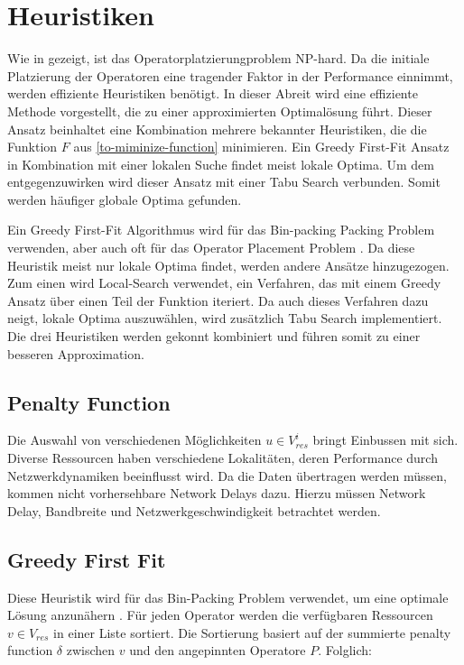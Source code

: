 \documentclass{article}
\begin{document}
\section{Heuristiken}
Wie in \cite{cardellini-optimal_operatorplc} gezeigt, ist das 
Operatorplatzierungproblem NP-hard.
Da die initiale Platzierung der Operatoren eine tragender Faktor
in der Performance einnimmt, werden effiziente Heuristiken benötigt. 
In dieser Abreit wird eine effiziente Methode vorgestellt, die 
zu einer approximierten Optimalösung führt. 
Dieser Ansatz beinhaltet eine Kombination mehrere bekannter Heuristiken, die die Funktion $F$ aus \ref{to-miminize-function} minimieren.  
Ein Greedy First-Fit Ansatz in Kombination mit einer lokalen Suche findet meist lokale Optima. 
Um dem entgegenzuwirken wird dieser Ansatz mit einer Tabu Search verbunden. 
Somit werden häufiger \cite{k3} globale Optima gefunden. 

Ein Greedy First-Fit Algorithmus wird für das Bin-packing Packing Problem verwenden, 
aber auch oft für das Operator Placement Problem \cite{k7}\cite{k8}.
Da diese Heuristik meist nur lokale Optima findet, werden andere Ansätze hinzugezogen. 
Zum einen wird Local-Search verwendet, ein Verfahren, 
das mit einem Greedy Ansatz über einen Teil der Funktion iteriert. Da auch dieses
Verfahren dazu neigt, lokale Optima auszuwählen, wird zusätzlich Tabu Search implementiert. 
Die drei Heuristiken werden gekonnt kombiniert und führen somit zu einer besseren Approximation. 

\subsection{Penalty Function} 
Die Auswahl von verschiedenen Möglichkeiten $u \in V_{res}^i$ bringt Einbussen mit sich. Diverse Ressourcen haben verschiedene Lokalitäten,
deren Performance durch Netzwerkdynamiken beeinflusst wird. Da die Daten übertragen werden müssen, kommen nicht vorhersehbare Network Delays dazu. Hierzu müssen Network Delay, 
Bandbreite und Netzwerkgeschwindigkeit\cite{k3} betrachtet werden.


\subsection{Greedy First Fit}
Diese Heuristik wird  für das Bin-Packing Problem verwendet, um eine optimale Lösung anzunähern \cite{greedy-first-fit}. 
Für jeden Operator werden die verfügbaren Ressourcen $v \in V_{res}$ in einer Liste sortiert. Die Sortierung basiert auf der summierte penalty function $\delta$
zwischen $v$ und den angepinnten Operatore $P$. Folglich:
\end{document}
